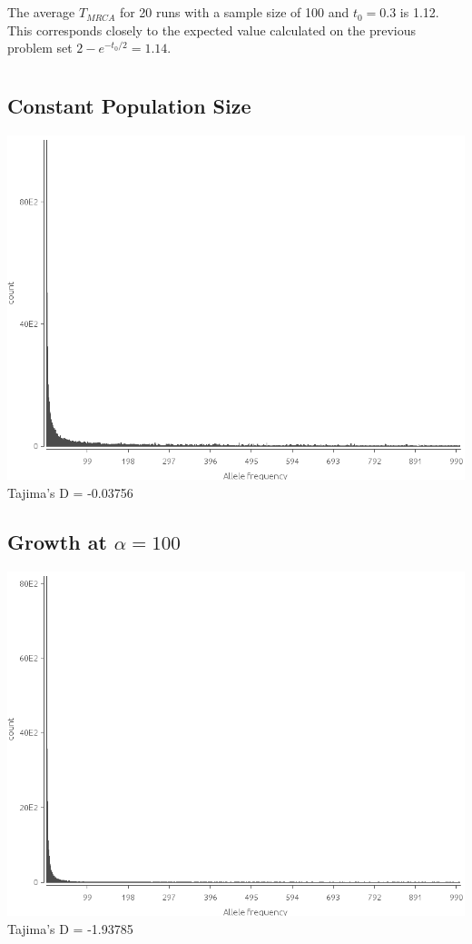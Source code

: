 \documentclass{article}
\begin{document}
\section{}
\subsection{}

\subsection{}
The average $T_{MRCA}$ for 20 runs with a sample size of 100 and $t_0 = 0.3$ is
1.12.  This corresponds closely to the expected value calculated on the previous
problem set $2 - e^{-t_0/2} = 1.14$.
\section{}
\subsection{Constant Population Size}
\includegraphics[width=\textwidth]{constant_size}
Tajima's D = -0.03756
\subsection{Growth at $\alpha = 100$}
\includegraphics[width=\textwidth]{growth}
Tajima's D = -1.93785
\end{document}
